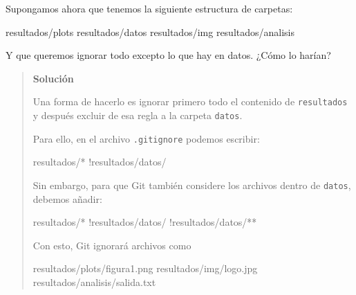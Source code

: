 \documentclass[
  spanish,
  12pt,
  letterpaper,
  DIV=11,
  numbers=noendperiod]{scrreprt}
\newenvironment{Shaded}{\begin{snugshade}}{\end{snugshade}}
\newcommand{\ExtensionTok}[1]{\textcolor[rgb]{0.00,0.23,0.31}{#1}}
\newcommand{\NormalTok}[1]{\textcolor[rgb]{0.00,0.23,0.31}{#1}}
\begin{document}
\begin{tcolorbox}[enhanced jigsaw, arc=.35mm, bottomrule=.15mm, bottomtitle=1mm, breakable, colback=white, colbacktitle=quarto-callout-note-color!10!white, colframe=quarto-callout-note-color-frame, coltitle=black, left=2mm, leftrule=.75mm, opacityback=0, opacitybacktitle=0.6, rightrule=.15mm, title=\textcolor{quarto-callout-note-color}{\faInfo}\hspace{0.5em}{Ejercicio 2}, titlerule=0mm, toprule=.15mm, toptitle=1mm]

Supongamos ahora que tenemos la siguiente estructura de carpetas:

\begin{Shaded}
\begin{Highlighting}[]
\ExtensionTok{resultados/plots}
\ExtensionTok{resultados/datos}
\ExtensionTok{resultados/img}
\ExtensionTok{resultados/analisis}
\end{Highlighting}
\end{Shaded}

Y que queremos ignorar todo excepto lo que hay en datos. ¿Cómo lo
harían?

\begin{quote}
\textbf{Solución}

Una forma de hacerlo es ignorar primero todo el contenido de
\texttt{resultados} y después excluir de esa regla a la carpeta
\texttt{datos}.

Para ello, en el archivo \texttt{.gitignore} podemos escribir:

\begin{Shaded}
\begin{Highlighting}[]
\NormalTok{resultados/*}
\NormalTok{!resultados/datos/}
\end{Highlighting}
\end{Shaded}

Sin embargo, para que Git también considere los archivos dentro de
\texttt{datos}, debemos añadir:

\begin{Shaded}
\begin{Highlighting}[]
\NormalTok{resultados/*}
\NormalTok{!resultados/datos/}
\NormalTok{!resultados/datos/**}
\end{Highlighting}
\end{Shaded}

Con esto, Git ignorará archivos como

\begin{Shaded}
\begin{Highlighting}[]
\NormalTok{resultados/plots/figura1.png}
\NormalTok{resultados/img/logo.jpg}
\NormalTok{resultados/analisis/salida.txt}
\end{Highlighting}
\end{Shaded}


\end{quote}
\end{tcolorbox}
\end{document}
